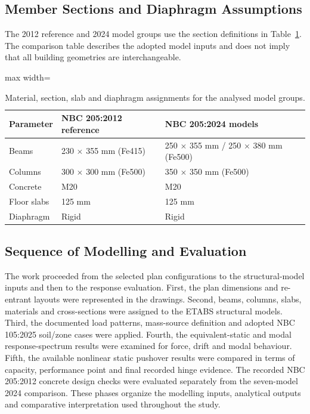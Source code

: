 \subsection{Member Sections and Diaphragm Assumptions}
The 2012 reference and 2024 model groups use the section definitions in Table~\ref{tab:seq035_geometry}. The comparison table describes the adopted model inputs and does not imply that all building geometries are interchangeable.
\begin{table}[!htbp]\centering
\caption{Material, section, slab and diaphragm assignments for the analysed model groups.}\label{tab:seq035_geometry}
\small\begin{adjustbox}{max width=\linewidth}
\begin{tabular}{@{}p{}p{}p{}@{}}\toprule
Parameter & NBC 205:2012 reference & NBC 205:2024 models \\\midrule
Beams & 230 $\times$ 355 mm (Fe415) & 250 $\times$ 355 mm / 250 $\times$ 380 mm (Fe500) \\
Columns & 300 $\times$ 300 mm (Fe500) & 350 $\times$ 350 mm (Fe500) \\
Concrete & M20 & M20 \\
Floor slabs & 125 mm & 125 mm \\
Diaphragm & Rigid & Rigid \\
\bottomrule\end{tabular}
\end{adjustbox}
\end{table}

\subsection{Sequence of Modelling and Evaluation}
The work proceeded from the selected plan configurations to the structural-model inputs and then to the response evaluation. First, the plan dimensions and re-entrant layouts were represented in the drawings. Second, beams, columns, slabs, materials and cross-sections were assigned to the ETABS structural models. Third, the documented load patterns, mass-source definition and adopted NBC 105:2025 soil/zone cases were applied. Fourth, the equivalent-static and modal response-spectrum results were examined for force, drift and modal behaviour. Fifth, the available nonlinear static pushover results were compared in terms of capacity, performance point and final recorded hinge evidence. The recorded NBC 205:2012 concrete design checks were evaluated separately from the seven-model 2024 comparison. These phases organize the modelling inputs, analytical outputs and comparative interpretation used throughout the study.

